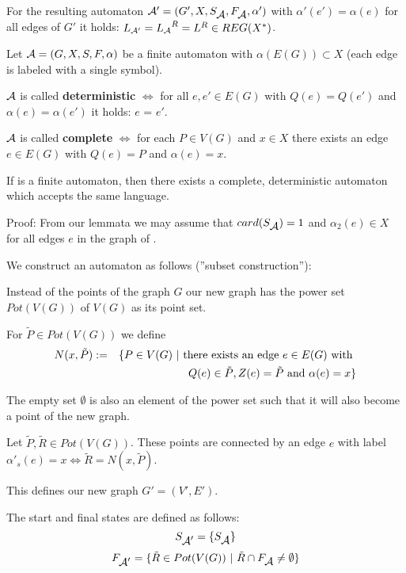 For the resulting automaton $\mbox{$\mathcal{A'}$} = (G', X, S_{\mbox{$\mathcal{A}$}},
F_{\mbox{$\mathcal{A}$}}, \alpha')$ with $\alpha'(e') = \alpha(e)$ for all edges of $G'$
it holds: $\mbox{$L_{\mathcal{A'}}$} = \mbox{$L_{\mathcal{A}}$}^R = L^R \in REG(X^*)$.

\begin{definition}
Let $\mbox{$\mathcal{A}$} = (G, X, S, F, \alpha)$ be a finite automaton with
$\alpha(E(G)) \subset X$ (each edge is labeled with a single
symbol).

$\mbox{$\mathcal{A}$}$ is called {\bf deterministic} $\Leftrightarrow$ for all $e, e'
\in E(G)$ with $Q(e) = Q(e')$ and $\alpha(e) = \alpha(e')$ it holds: $e$ = $e'$.

$\mbox{$\mathcal{A}$}$ is called {\bf complete} $\Leftrightarrow$ for each $P \in V(G)$
and $x \in X$ there exists an edge $e \in E(G)$ with $Q(e) = P$ and $\alpha(e)
= x$.
\end{definition}

\begin{theorem}
If  is a finite automaton, then there exists a complete,
deterministic automaton  which accepts the same language.
\end{theorem}

Proof: From our lemmata we may assume that $card(S_{\mbox{$\mathcal{A}$}}) = 1$ and
$\alpha_2(e) \in X$ for all edges $e$ in the graph of .

We construct an automaton  as follows (''subset construction''):

Instead of the points of the graph $G$ our new graph has the power set
$Pot(V(G))$ of $V(G)$ as its point set.

For $\tilde{P} \in Pot(V(G))$ we define 
\begin{eqnarray*}
& N(x, \tilde{P}) := & \{ P \in V(G) \ |\  \mbox{there exists an edge } e \in
E(G) \mbox{ with } \\
& & \ Q(e) \in \tilde{P}, Z(e) = \tilde{P} \mbox{ and } \alpha(e) = x \} 
\end{eqnarray*}

The empty set $\emptyset$ is also an element of the power set such that it will
also become a point of the new graph.

Let $\tilde{P}, \tilde{R} \in Pot(V(G))$. These points are connected by an edge
$e$ with label $\alpha'_s(e) = x \Leftrightarrow \tilde{R} = N(x, \tilde{P})$.

This defines our new graph $G' = (V', E')$.

The start and final states are defined as follows:
\[ S_{\mbox{$\mathcal{A'}$}} = \{ S_{\mbox{$\mathcal{A}$}} \} \]
\[ F_{\mbox{$\mathcal{A'}$}} = \{ \tilde{R} \in Pot(V(G)) \ |\  \tilde{R} \cap
F_{\mbox{$\mathcal{A}$}} \neq \emptyset \} \]

